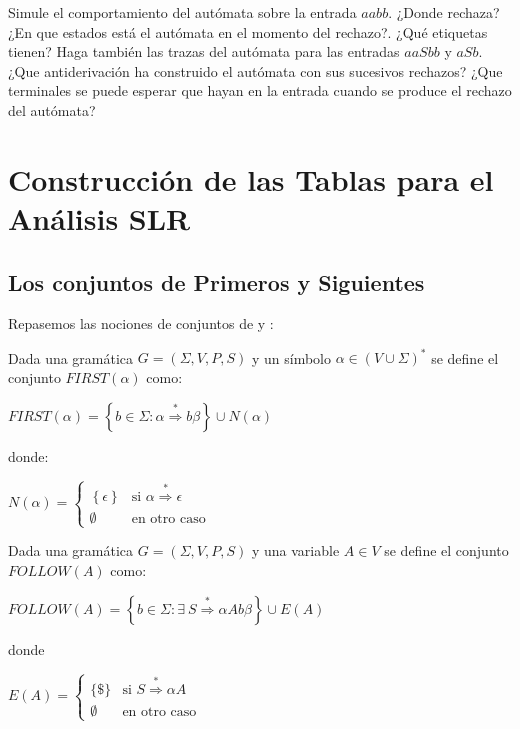 \begin{exercise}
Simule el comportamiento del autómata sobre la entrada $aabb$. ¿Donde rechaza?
¿En que estados está el autómata en el momento del rechazo?. ¿Qué etiquetas tienen?
Haga también las
trazas del autómata para las entradas $aaSbb$ y $aSb$. ¿Que antiderivación 
ha construido el autómata con sus sucesivos rechazos? ¿Que terminales
se puede esperar que hayan en la entrada cuando se produce el rechazo
del autómata?
\end{exercise}

\section{Construcción de las Tablas para el Análisis SLR}
\label{section:construcciontablasSLR}

\subsection{Los conjuntos de Primeros y Siguientes}
\label{subsection:firstandfollow}
Repasemos las nociones de conjuntos de  y :

\begin{definition}
Dada una gramática $G=(\Sigma,V,P,S)$ y un símbolo $\alpha \in (V \cup \Sigma)^*$ se define el conjunto $FIRST(\alpha)$ como:

$FIRST(\alpha) = \left \{ b \in \Sigma :  \alpha  \stackrel{*}{\Longrightarrow}  b \beta \right \}
\cup N(\alpha)$ 

\noindent donde:

$N(\alpha) = \left \{ \begin{array}{ll}
                         \left \{ \epsilon \right \}& \mbox{si $\alpha \stackrel{*}{\Longrightarrow} \epsilon$} \\
                         \emptyset & \mbox{en otro caso} 
                      \end{array}
             \right. $ 

\end{definition}

\begin{definition}
Dada una gramática $G=(\Sigma,V,P,S)$ y una variable $A \in V$ se define el conjunto $FOLLOW(A)$ como: 

$FOLLOW(A) = \left \{ b \in \Sigma :  \exists\ S  \stackrel{*}{\Longrightarrow}  \alpha A b \beta \right \} \cup E(A)$

\noindent donde

$E(A) = \left \{ \begin{array}{ll}
                         \{ \$  \}& \mbox{si $S \stackrel{*}{\Longrightarrow} \alpha A$} \\
                         \emptyset & \mbox{en otro caso} 
                      \end{array}
             \right. $ 

\end{definition}

